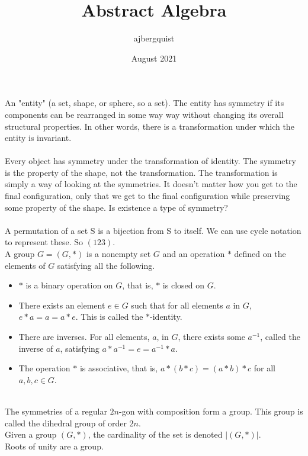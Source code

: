 \documentclass{article}
\title{Abstract Algebra}
\author{ajbergquist }
\date{August 2021}
\begin{document}
 An "entity" (a set, shape, or sphere, so a set). The entity has symmetry if its components can be rearranged in some way way without changing its overall structural properties. In other words, there is a transformation under which the entity is invariant.\\
\\
Every object has symmetry under the transformation of identity. The symmetry is the property of the shape, not the transformation. The transformation is simply a way of looking at the symmetries. It doesn't matter how you get to the final configuration, only that we get to the final configuration while preserving some property of the shape. Is existence a type of symmetry?\\
\\
 A permutation of a set S is a bijection from S to itself. We can use cycle notation to represent these. So $(123).$\\
 A group $G = (G,*)$ is a nonempty set $G$ and an operation $*$ defined on the elements of $G$ satisfying all the following.
\begin{itemize}
    \item $*$ is a binary operation on $G$, that is, $*$ is closed on $G$.
    \item There exists an element $e\in G$ such that for all elements $a$ in $G$, $e*a = a = a*e$. This is called the $*$-identity.
    \item There are inverses. For all elements, $a$, in $G$, there exists some $a^{-1}$, called the inverse of $a$, satisfying $a*a^{-1} = e = a^{-1}*a$.
    \item The operation $*$ is associative, that is, $a*(b*c) = (a*b)*c$ for all $a,b,c\in G$.
\end{itemize}\\

 The symmetries of a regular $2n$-gon with composition form a group. This group is called the dihedral group of order $2n$.\\

 Given a group $(G,*)$, the cardinality of the set is denoted $|(G,*)|$.\\

 Roots of unity are a group.
\end{document}
